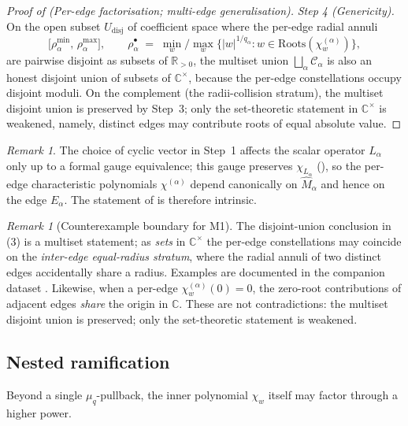 \documentclass[aip,jmp,preprint,amsmath,amssymb,nofootinbib,floatfix]{revtex4-2}
\theoremstyle{plain}
\theoremstyle{definition}
\theoremstyle{remark}
\newtheorem{remark}[theorem]{Remark}
\newcommand{\Roots}{\mathrm{Roots}}
\newcommand{\Cl}{\mathcal{C}}
\begin{document}
\begin{proof}[Proof of  (Per-edge factorisation; multi-edge
generalisation)]
\smallskip
\textit{Step 4 (Genericity).}
On the open subset $U_{\mathrm{disj}}$ of coefficient space where
the per-edge radial annuli
\[
   \big[\rho_\alpha^{\min},\, \rho_\alpha^{\max}\big],
   \qquad
   \rho_\alpha^{\bullet}
   \;=\;
   \min_w / \max_w\!\big\{|w|^{1/q_\alpha} : w \in
   \Roots(\chi_w^{(\alpha)})\big\},
\]
are pairwise disjoint as subsets of $\mathbb{R}_{> 0}$, the multiset
union $\bigsqcup_\alpha \Cl_\alpha$ is also an honest disjoint union
of subsets of $\mathbb{C}^\times$, because the per-edge constellations
occupy disjoint moduli. On the complement (the radii-collision
stratum), the multiset disjoint union is preserved by Step~3; only
the set-theoretic statement in $\mathbb{C}^\times$ is weakened,
namely, distinct edges may contribute roots of equal absolute value.
\end{proof}

\begin{remark}\label{rem:M1-cyclic-vector}
The choice of cyclic vector in Step~1 affects the scalar operator
$L_\alpha$ only up to a formal gauge equivalence; this gauge preserves
$\chi_{L_\alpha}$ (), so the per-edge
characteristic polynomials $\chi^{(\alpha)}$ depend canonically on
$\widehat{M}_\alpha$ and hence on the edge $E_\alpha$. The statement
of  is therefore intrinsic.
\end{remark}

\begin{remark}[Counterexample boundary for M1]\label{rem:M1-counter}
The disjoint-union conclusion in (3) is a multiset statement; as
\emph{sets} in $\mathbb{C}^\times$ the per-edge constellations may
coincide on the \emph{inter-edge equal-radius stratum}, where the
radial annuli of two distinct edges accidentally share a radius.
Examples are documented in the companion dataset \cite{wkb_dataset_v1}.
Likewise, when a per-edge $\chi_w^{(\alpha)}(0) = 0$, the zero-root
contributions of adjacent edges \emph{share} the origin in $\mathbb{C}$.
These are not contradictions: the multiset disjoint union is preserved;
only the set-theoretic statement is weakened.
\end{remark}

\subsection{Nested ramification}\label{ssec:N1}

Beyond a single $\mu_q$-pullback, the inner polynomial $\chi_w$ itself
may factor through a higher power.
\end{document}
